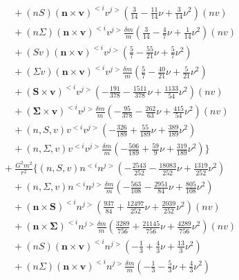 {\begin{eqnarray}
&&\qquad + (nS) (\mathbf{n}\times\mathbf{v})^{<i} v^{j>}\left(\frac{3}{14} -\frac{11}{14} \nu + \frac{3}{14} \nu^2\right) (nv) \nonumber \\ 
&&\qquad + (n\Sigma ) (\mathbf{n}\times\mathbf{v})^{<i} v^{j>}\frac{\delta m}{m}\left(\frac{3}{14} -\frac{4}{7} \nu + \frac{1}{14} \nu^2\right) (nv) \nonumber \\ 
&&\qquad + (Sv) (\mathbf{n}\times\mathbf{v})^{<i} v^{j>}\left(\frac{5}{7} -\frac{55}{21} \nu + \frac{5}{7} \nu^2\right) \nonumber \\ 
&&\qquad + (\Sigma v) (\mathbf{n}\times\mathbf{v})^{<i} v^{j>}\frac{\delta m}{m}\left(\frac{5}{7} -\frac{40}{21} \nu + \frac{5}{21} \nu^2\right) \nonumber \\ 
&&\qquad + (\mathbf{S}\times\mathbf{v})^{<i} v^{j>}\left(-\frac{191}{378} -\frac{1511}{378} \nu + \frac{1133}{54} \nu^2\right) (nv) \nonumber \\ 
&&\qquad + (\mathbf{\Sigma}\times\mathbf{v})^{<i} v^{j>}\frac{\delta m}{m}\left(-\frac{95}{378} -\frac{262}{63} \nu + \frac{415}{54} \nu^2\right) (nv) \nonumber \\ 
&&\qquad + (n,S,v) v^{<i} v^{j>}\left(-\frac{326}{189} + \frac{55}{189} \nu + \frac{389}{189} \nu^2\right) \nonumber \\ 
&&\qquad + (n,\Sigma ,v) v^{<i} v^{j>}\frac{\delta m}{m}\left(-\frac{506}{189} + \frac{59}{9} \nu + \frac{319}{189} \nu^2\right)\bigg\}\nonumber \\
 &&\quad+\frac{G^{2}m^{2}}{r^2}\bigg\{
(n,S,v) n^{<i} n^{j>}\left(-\frac{2543}{252} -\frac{18083}{252} \nu + \frac{1319}{252} \nu^2\right) \nonumber \\ 
&&\qquad + (n,\Sigma ,v) n^{<i} n^{j>}\frac{\delta m}{m}\left(-\frac{563}{108} -\frac{2951}{84} \nu + \frac{805}{108} \nu^2\right) \nonumber \\ 
&&\qquad + (\mathbf{n}\times\mathbf{S})^{<i} n^{j>}\left(\frac{937}{84} + \frac{12497}{252} \nu + \frac{2039}{252} \nu^2\right) (nv) \nonumber \\ 
&&\qquad + (\mathbf{n}\times\mathbf{\Sigma})^{<i} n^{j>}\frac{\delta m}{m}\left(\frac{3289}{756} + \frac{21145}{756} \nu + \frac{4289}{756} \nu^2\right) (nv) \nonumber \\ 
&&\qquad + (nS) (\mathbf{n}\times\mathbf{v})^{<i} n^{j>}\left(-\frac{1}{3} + \frac{4}{3} \nu + \frac{13}{3} \nu^2\right) \nonumber \\ 
&&\qquad + (n\Sigma ) (\mathbf{n}\times\mathbf{v})^{<i} n^{j>}\frac{\delta m}{m}\left(-\frac{1}{3} -\frac{5}{3} \nu + \frac{4}{3} \nu^2\right) \nonumber \\ 

\end{eqnarray}}
